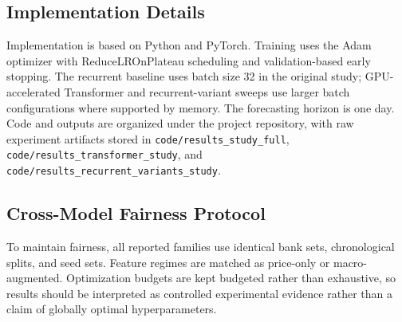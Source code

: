 \subsection{Implementation Details}
Implementation is based on Python and PyTorch. Training uses the Adam optimizer with ReduceLROnPlateau scheduling and validation-based early stopping. The recurrent baseline uses batch size 32 in the original study; GPU-accelerated Transformer and recurrent-variant sweeps use larger batch configurations where supported by memory. The forecasting horizon is one day. Code and outputs are organized under the project repository, with raw experiment artifacts stored in \texttt{code/results\_study\_full}, \texttt{code/results\_transformer\_study}, and \texttt{code/results\_recurrent\_variants\_study}.

\subsection{Cross-Model Fairness Protocol}
To maintain fairness, all reported families use identical bank sets, chronological splits, and seed sets. Feature regimes are matched as price-only or macro-augmented. Optimization budgets are kept budgeted rather than exhaustive, so results should be interpreted as controlled experimental evidence rather than a claim of globally optimal hyperparameters.
